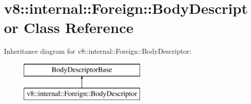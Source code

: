 \hypertarget{classv8_1_1internal_1_1_foreign_1_1_body_descriptor}{}\section{v8\+:\+:internal\+:\+:Foreign\+:\+:Body\+Descriptor Class Reference}
\label{classv8_1_1internal_1_1_foreign_1_1_body_descriptor}
Inheritance diagram for v8\+:\+:internal\+:\+:Foreign\+:\+:Body\+Descriptor\+:\begin{figure}[H]
\begin{center}
\leavevmode
\includegraphics[height=2.000000cm]{classv8_1_1internal_1_1_foreign_1_1_body_descriptor}
\end{center}
\end{figure}
